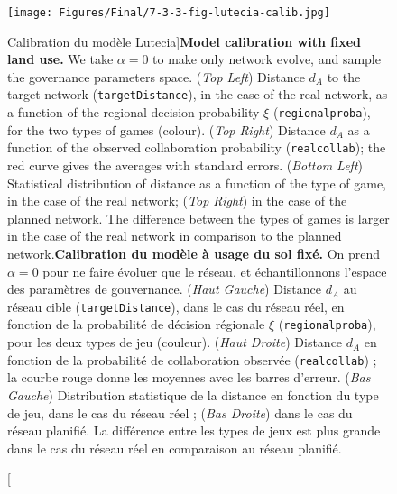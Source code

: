 \begin{figure}
	\texttt{[image: Figures/Final/7-3-3-fig-lutecia-calib.jpg]}
	\caption[Calibration of the Lutecia model][Calibration du modèle Lutecia]{\textbf{Model calibration with fixed land use.} We take $\alpha = 0$ to make only network evolve, and sample the governance parameters space. (\textit{Top Left}) Distance $d_A$ to the target network (\texttt{targetDistance}), in the case of the real network, as a function of the regional decision probability $\xi$ (\texttt{regionalproba}), for the two types of games (colour). (\textit{Top Right}) Distance $d_A$ as a function of the observed collaboration probability (\texttt{realcollab}); the red curve gives the averages with standard errors. (\textit{Bottom Left}) Statistical distribution of distance as a function of the type of game, in the case of the real network; (\textit{Top Right}) in the case of the planned network. The difference between the types of games is larger in the case of the real network in comparison to the planned network.\label{fig:lutecia:calib}}{\textbf{Calibration du modèle à usage du sol fixé.} On prend $\alpha = 0$ pour ne faire évoluer que le réseau, et échantillonnons l'espace des paramètres de gouvernance. (\textit{Haut Gauche}) Distance $d_A$ au réseau cible (\texttt{targetDistance}), dans le cas du réseau réel, en fonction de la probabilité de décision régionale $\xi$ (\texttt{regionalproba}), pour les deux types de jeu (couleur). (\textit{Haut Droite}) Distance $d_A$ en fonction de la probabilité de collaboration observée (\texttt{realcollab}) ; la courbe rouge donne les moyennes avec les barres d'erreur. (\textit{Bas Gauche}) Distribution statistique de la distance en fonction du type de jeu, dans le cas du réseau réel ; (\textit{Bas Droite}) dans le cas du réseau planifié. La différence entre les types de jeux est plus grande dans le cas du réseau réel en comparaison au réseau planifié.\label{fig:lutecia:calib}}
\end{figure}


